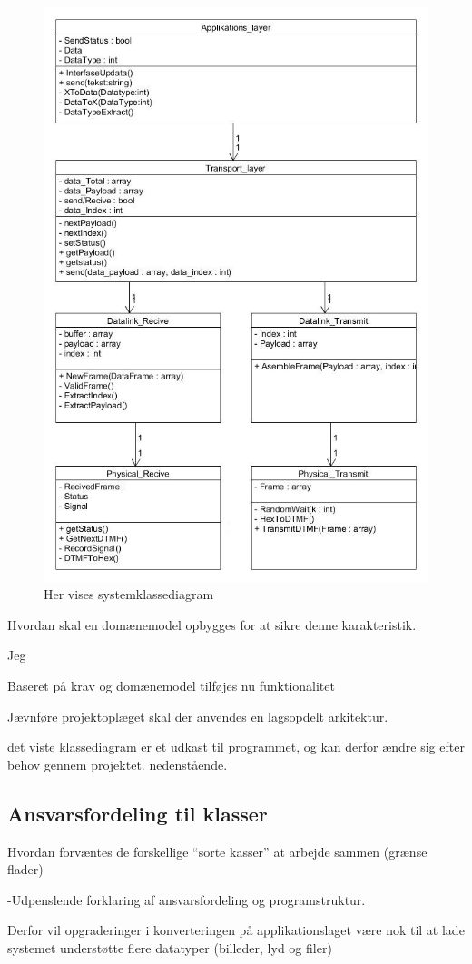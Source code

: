 \begin{figure}[h]
\centering
\includegraphics[scale=0.55]{Billeder/Klassediagram_v1.JPG}
\caption{Her vises systemklassediagram}
\label{fig:Klassediagram_v1}
\end{figure}


Hvordan skal en domænemodel opbygges for at sikre denne karakteristik. 

Jeg 

Baseret på krav og domænemodel tilføjes nu funktionalitet

Jævnføre projektoplæget skal der anvendes en lagsopdelt arkitektur. 

det viste klassediagram er et udkast til programmet, og kan derfor ændre sig efter behov gennem projektet. nedenstående.


\subsection{Ansvarsfordeling til klasser}
Hvordan forvæntes de forskellige “sorte kasser” at arbejde sammen (grænse flader)

-Udpenslende forklaring af ansvarsfordeling og programstruktur.  

Derfor vil opgraderinger i konverteringen på applikationslaget være nok til at lade systemet understøtte flere datatyper (billeder, lyd og filer)